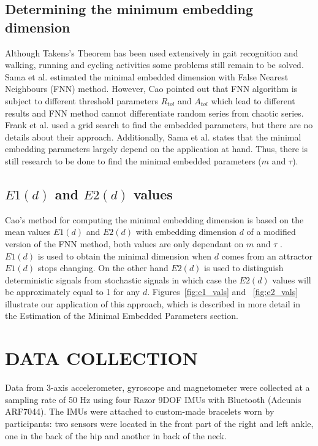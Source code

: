 \documentclass{sigchi}
\begin{document}
\subsection{Determining the minimum embedding dimension}
Although Takens's Theorem has been used extensively in gait recognition \cite{Sama2013} 
and walking, running and cycling activities \cite{Frank2010} some problems still remain to be solved.
Sama et al. \cite{Sama2013} estimated the minimal embedded dimension with False Nearest Neighbours (FNN) method.
However, Cao \cite{Cao1997} pointed out that FNN algorithm is subject to different threshold parameters 
$R_{tol}$ and $A_{tol}$  which lead to different results and FNN method cannot differentiate random series 
from chaotic series. Frank et al. \cite{Frank2010} used a grid search 
to find the embedded parameters, but there are no details about their approach.
Additionally, Sama et al. \cite{Sama2013} states that the minimal embedding parameters largely depend on the 
application at hand. Thus, there is still research to be done to find the minimal 
embedded parameters ($m$ and $\tau$).

\newpage
\subsection{$E1(d)$ and $E2(d)$ values}
Cao's method for computing the minimal embedding dimension is based on the mean values $E1(d)$ and $E2(d)$ 
with embedding dimension $d$ of a modified version of the FNN method, both values are only dependant on $m$ and $\tau$ \cite{Cao1997}.
$E1(d)$ is used to obtain the minimal dimension when $d$ comes from an attractor $E1(d)$ stops changing.
On the other hand $E2(d)$ is used to distinguish deterministic signals from stochastic signals 
in which case the $E2(d)$ values will be approximately equal to 1 for any $d$.
Figures~\ref{fig:e1_vals} and ~\ref{fig:e2_vals} illustrate our application of this approach,
which is described in more detail in the Estimation of the Minimal Embedded Parameters section.

\section{DATA COLLECTION}
Data from 3-axis accelerometer, gyroscope and magnetometer were collected at a sampling rate of 50 Hz 
using four Razor 9DOF IMUs with Bluetooth (Adeunis ARF7044). 
The IMUs were attached to custom-made bracelets worn by participants: 
two sensors were located in the front part of the right and left ankle, one in the 
back of the hip and another in back of the neck. 
\end{document}
